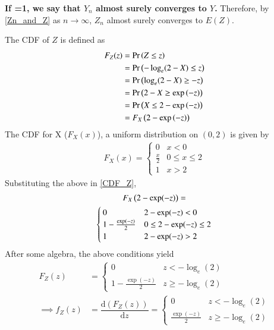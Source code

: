 \documentclass[journal,12pt,twocolumn]{IEEEtran}
\begin{document}
\textbf{If =1, we say that $Y_n$ almost surely converges to $Y$.} Therefore, by \eqref{Zn_and_Z} as $n \to \infty$, $Z_n$ almost surely converges to $E(Z)$.\\
\par The CDF of $Z$ is defined as 
\begin{align}
    F_Z(z) &= \pr{Z \leq z} \\
           &= \pr{ -\log_e(2-X)\leq z} \\
           &= \pr{\log_e(2-X) \geq -z}\\
           &= \pr{2-X \geq \exp\brak{-z}}\\
           &= \pr{X \leq 2- \exp\brak{-z}}\\
           &= F_X\brak{2- \exp\brak{-z}}
\label{CDF_Z}
\end{align}
The CDF for X ($F_X(x)$), a uniform distribution on $(0,2)$ is given by
\begin{align}
F_X(x) = 
\begin{cases}
0 &  x < 0 \\
\frac{x}{2} & 0 \leq x \leq 2 \\
1 & x > 2
\end{cases}
\end{align}
%
Substituting the above in \eqref{CDF_Z},
%
\begin{multline}
F_X\left(2- \exp(-z)\right) =
\\
\begin{cases}
0 &  2- \exp(-z) < 0 \\
1- \frac{\exp(-z)}{2} & 0 \leq 2- \exp(-z) \leq 2 \\
1 & 2- \exp(-z) > 2
\end{cases}
\end{multline}
After some algebra, the above conditions yield
\begin{align}
F_Z(z) &= 
\begin{cases}
0 & z < -\log_e (2) \\
1- \frac{\exp(-z)}{2} & z \geq -\log_e (2)
\end{cases}
\label{CDF_Z_Final}\\
\implies f_Z(z)&=\dfrac{\text{d}(F_Z(z))}{\text{d}z}   
=\begin{cases}
0 & z < -\log_e (2) \\
\frac{\exp(-z)}{2} & z \geq -\log_e (2)
\end{cases}
\label{PDF_Z_Final}
\end{align}
\end{document}
